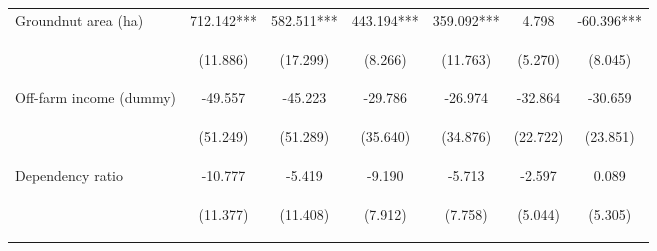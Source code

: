 \begin{center}
\begin{tabular}{lcccccc}
Groundnut area (ha) & 712.142*** & 582.511*** & 443.194*** & 359.092*** & 4.798 & -60.396*** \\
\vspace{4pt} & \begin{footnotesize}(11.886)\end{footnotesize} & \begin{footnotesize}(17.299)\end{footnotesize} & \begin{footnotesize}(8.266)\end{footnotesize} & \begin{footnotesize}(11.763)\end{footnotesize} & \begin{footnotesize}(5.270)\end{footnotesize} & \begin{footnotesize}(8.045)\end{footnotesize} \\
Off-farm income (dummy) & -49.557 & -45.223 & -29.786 & -26.974 & -32.864 & -30.659 \\
\vspace{4pt} & \begin{footnotesize}(51.249)\end{footnotesize} & \begin{footnotesize}(51.289)\end{footnotesize} & \begin{footnotesize}(35.640)\end{footnotesize} & \begin{footnotesize}(34.876)\end{footnotesize} & \begin{footnotesize}(22.722)\end{footnotesize} & \begin{footnotesize}(23.851)\end{footnotesize} \\
Dependency ratio & -10.777 & -5.419 & -9.190 & -5.713 & -2.597 & 0.089 \\
\vspace{4pt} & \begin{footnotesize}(11.377)\end{footnotesize} & \begin{footnotesize}(11.408)\end{footnotesize} & \begin{footnotesize}(7.912)\end{footnotesize} & \begin{footnotesize}(7.758)\end{footnotesize} & \begin{footnotesize}(5.044)\end{footnotesize} & \begin{footnotesize}(5.305)\end{footnotesize} \\

\end{tabular}
\end{center}
